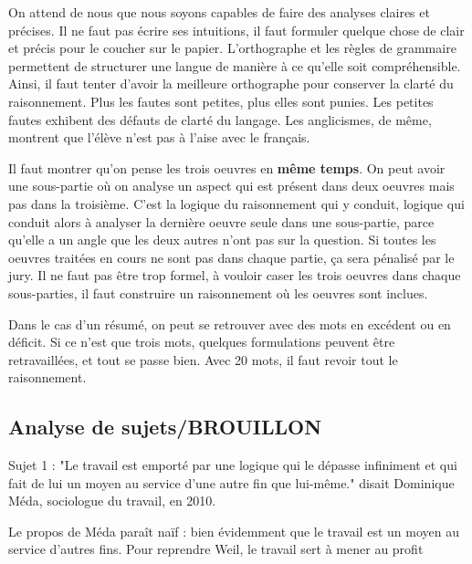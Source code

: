 \documentclass[a4paper,12pt]{book}
\begin{document}
\par On attend de nous que nous soyons capables de faire des analyses claires et précises. Il ne faut pas écrire ses intuitions, il faut formuler quelque chose de clair et précis pour le coucher sur le papier. L'orthographe et les règles de grammaire permettent de structurer une langue de manière à ce qu'elle soit compréhensible. Ainsi, il faut tenter d'avoir la meilleure orthographe pour conserver la clarté du raisonnement. Plus les fautes sont petites, plus elles sont punies. Les petites fautes exhibent des défauts de clarté du langage. Les anglicismes, de même, montrent que l'élève n'est pas à l'aise avec le français.
\par Il faut montrer qu'on pense les trois oeuvres en \textbf{même temps}. On peut avoir une sous-partie où on analyse un aspect qui est présent dans deux oeuvres mais pas dans la troisième. C'est la logique du raisonnement qui y conduit, logique qui conduit alors à analyser la dernière oeuvre seule dans une sous-partie, parce qu'elle a un angle que les deux autres n'ont pas sur la question. Si toutes les oeuvres traitées en cours ne sont pas dans chaque partie, ça sera pénalisé par le jury. Il ne faut pas être trop formel, à vouloir caser les trois oeuvres dans chaque sous-parties, il faut construire un raisonnement où les oeuvres sont inclues.
\par Dans le cas d'un résumé, on peut se retrouver avec des mots en excédent ou en déficit. Si ce n'est que trois mots, quelques formulations peuvent être retravaillées, et tout se passe bien. Avec 20 mots, il faut revoir tout le raisonnement.

\subsection{Analyse de sujets/BROUILLON}
Sujet 1 : "Le travail est emporté par une logique qui le dépasse infiniment et qui fait de lui un moyen au service d'une autre fin que lui-même." disait Dominique Méda, sociologue du travail, en 2010. 
\par Le propos de Méda paraît naïf : bien évidemment que le travail est un moyen au service d'autres fins. Pour reprendre Weil, le travail sert à mener au profit
\end{document}
